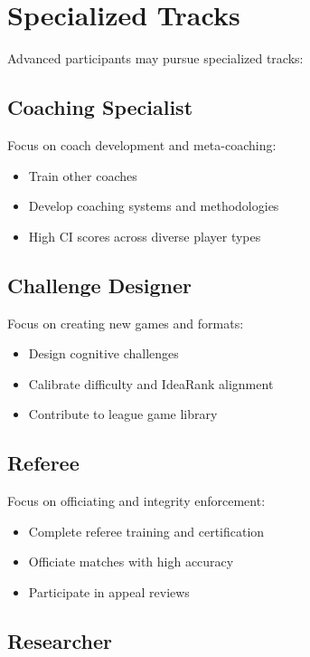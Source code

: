 \section{Specialized Tracks}

Advanced participants may pursue specialized tracks:

\subsection{Coaching Specialist}

Focus on coach development and meta-coaching:
\begin{itemize}[leftmargin=*]
  \item Train other coaches
  \item Develop coaching systems and methodologies
  \item High CI scores across diverse player types
\end{itemize}

\subsection{Challenge Designer}

Focus on creating new games and formats:
\begin{itemize}[leftmargin=*]
  \item Design cognitive challenges
  \item Calibrate difficulty and IdeaRank alignment
  \item Contribute to league game library
\end{itemize}

\subsection{Referee}

Focus on officiating and integrity enforcement:
\begin{itemize}[leftmargin=*]
  \item Complete referee training and certification
  \item Officiate matches with high accuracy
  \item Participate in appeal reviews
\end{itemize}

\subsection{Researcher}

